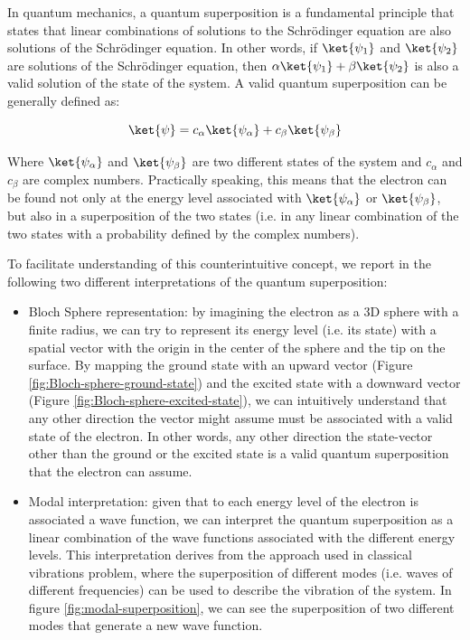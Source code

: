 In quantum mechanics, a quantum superposition is a fundamental principle that states that linear combinations of solutions to the Schr\"{o}dinger equation are also solutions of the Schr\"{o}dinger equation.
In other words, if $\ket{\psi_1}$ and $\ket{\psi_2}$ are solutions of the Schr\"{o}dinger equation, then $\alpha\ket{\psi_1} + \beta\ket{\psi_2}$ is also a valid solution of the state of the system.
A valid quantum superposition can be generally defined as:

\begin{equation}
    \ket{\psi} = c_\alpha\ket{\psi_\alpha} + c_\beta\ket{\psi_\beta}
\end{equation}

Where $\ket{\psi_\alpha}$ and $\ket{\psi_\beta}$ are two different states of the system and $c_\alpha$ and $c_\beta$ are complex numbers.
Practically speaking, this means that the electron can be found not only at the energy level associated with $\ket{\psi_\alpha}$ or $\ket{\psi_\beta}$, but also in a superposition of the two states (i.e. in any linear combination of the two states with a probability defined by the complex numbers).

To facilitate understanding of this counterintuitive concept, we report in the following two different interpretations of the quantum superposition:

\begin{itemize}
    \item Bloch Sphere representation: by imagining the electron as a 3D sphere with a finite radius, we can try to represent its energy level (i.e. its state) with a spatial vector with the origin in the center of the sphere and the tip on the surface. By mapping the ground state with an upward vector (Figure \ref{fig:Bloch-sphere-ground-state}) and the excited state with a downward vector (Figure \ref{fig:Bloch-sphere-excited-state}), we can intuitively understand that any other direction the vector might assume must be associated with a valid state of the electron. In other words, any other direction the state-vector other than the ground or the excited state is a valid quantum superposition that the electron can assume.
    \item Modal interpretation: given that to each energy level of the electron is associated a wave function, we can interpret the quantum superposition as a linear combination of the wave functions associated with the different energy levels. This interpretation derives from the approach used in classical vibrations problem, where the superposition of different modes (i.e. waves of different frequencies) can be used to describe the vibration of the system. In figure \ref{fig:modal-superposition}, we can see the superposition of two different modes that generate a new wave function.
\end{itemize}

